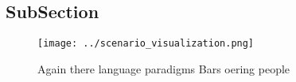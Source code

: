 \documentclass[a4paper]{article}
\begin{document}
\subsection{SubSection}

\begin{figure}
\centering
\texttt{[image: ../scenario\_visualization.png]}
\caption{Again there language paradigms Bars oering people
}
\end{figure}
 
\end{document}
